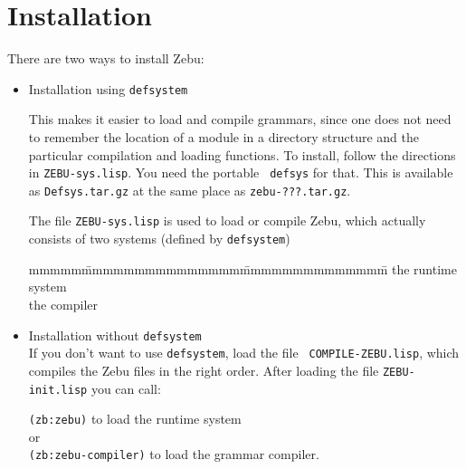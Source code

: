 \section{Installation}
\label{installation}

There are two ways to install {\sf Zebu}:

\begin{itemize}
  \item  Installation using {\tt defsystem}

This makes it easier to load and compile grammars, since one does not
need to remember the location of a module in a directory structure and
the particular compilation and loading functions.  To install, follow
the directions in {\tt ZEBU-sys.lisp}.  You need the portable {\tt
defsys} for that.  This is available as {\tt Defsys.tar.gz} at the same
place as {\tt zebu-???.tar.gz}.

The file {\tt ZEBU-sys.lisp} is used to load or compile {\sf Zebu},
which actually consists of two systems (defined by {\tt defsystem})

\begin{tabbing}
mmmmm\=mmmmmmmmmmmmmmm\=mmmmmmmmmmmmmm\=\kill
                \>the runtime system\\
       \>the compiler\\
\end{tabbing}

  \item  Installation without {\tt defsystem}\\
If you don't want to use {\tt defsystem}, load the file {\tt
COMPILE-ZEBU.lisp}, which compiles the {\sf Zebu} files in the right
order.
   
After loading the file {\tt ZEBU-init.lisp} you can call:

       {\tt (zb:zebu)}                to load the runtime system\\
or\\
       {\tt (zb:zebu-compiler)}       to load the grammar compiler.
\end{itemize}


